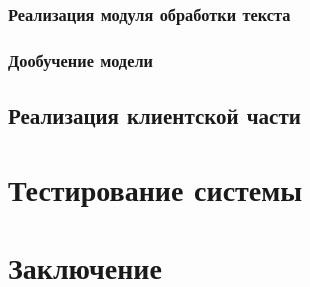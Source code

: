 \documentclass[PI, VKR]{HSEUniversity}
\begin{document}
\subsection{Реализация модуля обработки текста}
\label{sec:org87076be}
\subsection{Дообучение модели}
\label{sec:org4e15a37}
\section{Реализация клиентской части}
\label{sec:org4892f8a}
\chapter{Тестирование системы}
\label{sec:org48418f6}
\chapter*{Заключение}
\label{sec:orgfebf709}
\putbibliography
\appendix
\end{document}

